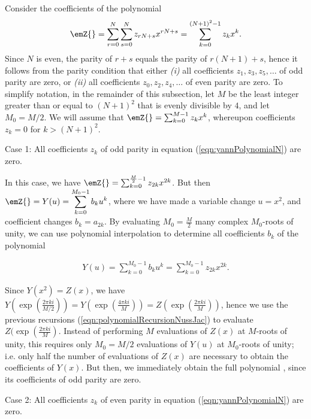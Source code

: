 Consider the coefficients of the polynomial
\begin{align}
\label{eqn:yannPolynomialN}
\emZ{} = \sum_{r=0}^{N} \sum_{s=0}^{N} z_{rN+s} x^{rN+s}
= \sum_{k=0}^{(N+1)^2-1} z_k x^k.
\end{align}
Since $N$ is even, the parity of $r+s$ equals the parity of
$r(N+1)+s$, hence  it follows from the parity condition that either
{\em (i)} all coefficients $z_1,z_3,z_5,\ldots$ of odd parity are zero,
or {\em (ii)} all coefficients $z_0,z_2,z_4,\ldots$ of even parity are zero.
To simplify notation, in the remainder of this subsection, let $M$ be
the least integer greater than or equal to $(N+1)^2$ that is evenly divisible
by $4$, and let $M_0=M/2$. We will assume that $\emZ{} = \sum_{k=0}^{M-1}
z_k x^k$, whereupon coefficients $z_k=0$ for $k>(N+1)^2$.
\smallskip

\noindent
{\sc Case 1}: All coefficients $z_k$ of odd parity in
equation (\ref{eqn:yannPolynomialN}) are zero.
\smallskip

\noindent
In this case, we have
$\emZ{} = \sum_{k=0}^{\frac{M}{2}-1} z_{2k} x^{2k}$. But then
$\emZ{} = Y(u) = \displaystyle\sum_{k=0}^{M_0-1} b_k u^k$,
where we have made a variable change $u=x^2$, and coefficient changes
$b_k = a_{2k}$.
By evaluating $M_0=\frac{M}{2}$ many complex
$M_0$-roots of unity, we can
use polynomial interpolation to determine all coefficients $b_k$ of
the polynomial

\begin{align}
Y(u) = \displaystyle\sum_{k=0}^{M_0-1} b_k u^k =
\displaystyle\sum_{k=0}^{M_0-1} z_{2k} x^{2k}.
\end{align}


Since $Y(x^2)=Z(x)$, we have
$Y(\exp(\frac{2\pi k i}{M/2})) =
Y(\exp(\frac{4\pi k i}{M})) =
Z(\exp(\frac{2\pi k i}{M}))$, hence we
use the previous recursions (\ref{eqn:polynomialRecursionNussJac})
to evaluate $Z(\exp(\frac{2\pi ki}{M})$.  Instead of
performing $M$ evaluations of $Z(x)$ at $M$-roots of unity,
this requires only $M_0=M/2$ evaluations of $Y(u)$ at
$M_0$-roots of unity; i.e. only half the number of
evaluations of $Z(x)$ are necessary to
obtain the coefficients of $Y(x)$. But then, we immediately obtain the
full polynomial \emZ{}, since its coefficients of odd  parity are zero.
\medskip

\noindent
{\sc Case 2}: All coefficients $z_k$ of even parity in
equation (\ref{eqn:yannPolynomialN}) are zero.
\smallskip


